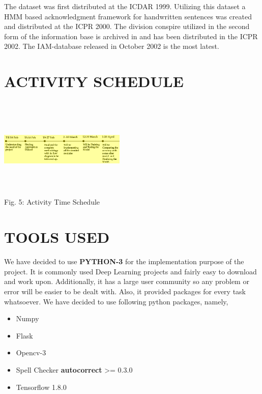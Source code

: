 \documentclass[12pt, conference]{IEEEtran}
\begin{document}
The dataset was first distributed at the ICDAR 1999. Utilizing this dataset a HMM based acknowledgment framework for handwritten sentences was created and distributed at the ICPR 2000. The division conspire utilized in the second form of the information base is archived in and has been distributed in the ICPR 2002. The IAM-database released in October 2002 is the most latest.

\section{\textbf{ACTIVITY SCHEDULE}}
\textbf{\\}
\includegraphics[width=0.45\textwidth, height=4cm]{img7.jpg}
\begin{center}
    Fig. 5: Activity Time Schedule
\end{center}

\section{\textbf{TOOLS USED}}
We have decided to use \textbf{PYTHON-3} for the implementation purpose of the project. It is commonly used Deep Learning projects and fairly easy to download and work upon. Additionally, it has a large user community so any problem or error will be easier to be dealt with. Also, it provided packages for every task whatsoever. We have decided to use following python packages, namely,
\begin{itemize}
    \item Numpy
    \item Flask
    \item Opencv-3
    \item Spell Checker \textbf{autocorrect} >= 0.3.0
    \item Tensorflow 1.8.0
\end{itemize}
\end{document}
